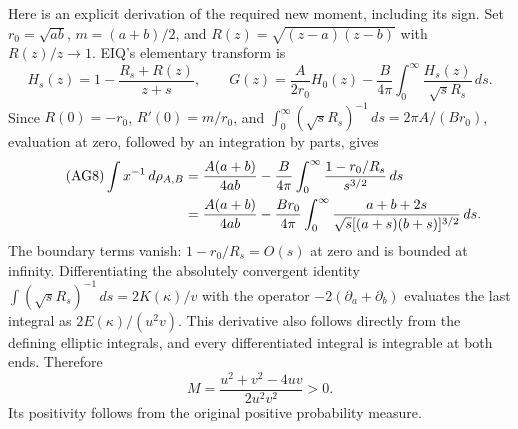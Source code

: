 \documentclass[11pt]{article}
\newcommand{\dd}{\,d}\newcommand{\Gram}{\operatorname{Gram}}
\begin{document}
Here is an explicit derivation of the required new moment, including its sign.
Set $r_0=\sqrt{ab}$, $m=(a+b)/2$, and
$R(z)=\sqrt{(z-a)(z-b)}$ with $R(z)/z\to1$. EIQ's elementary transform is
\[
 H_s(z)=1-\frac{R_s+R(z)}{z+s},\qquad
 G(z)=\frac{A}{2r_0}H_0(z)-\frac B{4\pi}
       \int_0^\infty\frac{H_s(z)}{\sqrt s R_s}\dd s.
\]
Since $R(0)=-r_0$, $R'(0)=m/r_0$, and
$\int_0^\infty (\sqrt sR_s)^{-1}\dd s=2\pi A/(Br_0)$,
evaluation at zero, followed by an integration by parts, gives
\begin{align}\tag{AG8}
 \int x^{-1}\dd\rho_{A,B}
 &=\frac{A(a+b)}{4ab}
   -\frac B{4\pi}\int_0^\infty
           \frac{1-r_0/R_s}{s^{3/2}}\dd s\\
 &=\frac{A(a+b)}{4ab}
   -\frac{Br_0}{4\pi}\int_0^\infty
         \frac{a+b+2s}{\sqrt s[(a+s)(b+s)]^{3/2}}\dd s.\notag
\end{align}
The boundary terms vanish: $1-r_0/R_s=O(s)$ at zero and is bounded at infinity.
Differentiating the absolutely convergent identity
$\int (\sqrt sR_s)^{-1}\dd s=2K(\kappa)/v$ with the operator
$-2(\partial_a+\partial_b)$ evaluates the last integral as $2E(\kappa)/(u^2v)$.
This derivative also follows directly from the defining elliptic integrals,
and every differentiated integral is integrable at both ends. Therefore
\begin{equation}\tag{AG9}
 M=\frac{u^2+v^2-4uv}{2u^2v^2}>0.
\end{equation}
Its positivity follows from the original positive probability measure.
\end{document}
